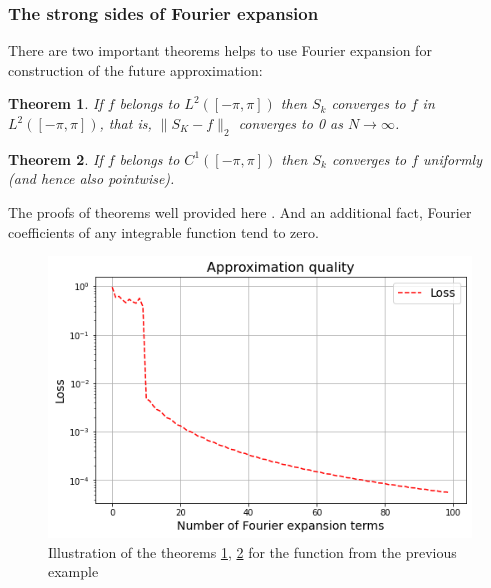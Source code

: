 \subsubsection{The strong sides of Fourier expansion}
There are two important theorems helps to use Fourier expansion for construction of the future approximation:

\newtheorem{theorem}{Theorem}[chapter]
\begin{theorem}
\label{convergence-l2-norm}
If $f$ belongs to $L^{2}(\left[-\pi ,\pi \right])$ then $S_k$ converges to $f$ in $L^{2}(\left[-\pi ,\pi \right])$, that is, $\|S_K - f\|_{2}$ converges to 0 as $N \rightarrow \infty$.
\end{theorem}
\begin{theorem}
\label{convergence-pointwise}
If $f$ belongs to $C^1(\left[-\pi ,\pi \right])$ then $S_k$ converges to $f$ uniformly (and hence also pointwise).
\end{theorem}
The proofs of theorems well provided here \cite{fourierintro}. And an additional fact, Fourier coefficients of any integrable function tend to zero. 


\begin{figure}[h]
	\centering
	\includegraphics[width=0.65 \textwidth]{images/chapter2/fourier_quality.png}
	\caption{Illustration of the theorems \ref{convergence-l2-norm}, \ref{convergence-pointwise} for the function from the previous example}
	\label{fig:fourier_quality}
\end{figure}